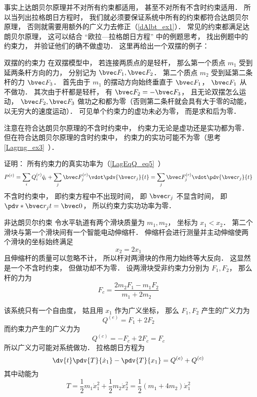 事实上达朗贝尔原理并不对所有约束都适用， 甚至不对所有不含时约束适用． 所以当列出拉格朗日方程时， 我们就必须要保证系统中所有的约束都符合达朗贝尔原理， 否则就需要用额外的广义力去修正（\autoref{dAlbt_ex1}）． 常见的约束都满足达朗贝尔原理， 这可以结合 “欧拉—拉格朗日方程” 中的例题思考， 找出例题中的约束力， 并验证他们的确不做虚功． 这里再给出一个双摆的例子：

\begin{example}{双摆的约束力}
在双摆模型中， 若连接两质点的是轻杆， 那么第一个质点 $m_1$ 受到延两条杆方向的力， 分别记为 $\bvec F_1, \bvec F_2$． 第二个质点 $m_2$ 受到延第二条杆的力 $\bvec F_3$． 首先由于 $m_1$ 的摆动方向始终垂直于 $\bvec F_1$， $\bvec F_1$ 从不做功． 其次由于杆都是轻杆， 有 $\bvec F_2 = -\bvec F_3$， 且无论双摆怎么运动， $\bvec F_2, \bvec F_3$ 做功之和都为零（否则第二条杆就会具有大于零的动能， 以无穷大的速度运动）． 可见单个约束力的虚功未必为零， 而是求和后为零．
\end{example}

注意在符合达朗贝尔原理的不含时约束中， 约束力无论是虚功还是实功都为零． 但在符合达朗贝尔原理的含时约束中， 约束力的实功可能不为零（思考\autoref{Lagrng_ex3}~）．

证明： 所有约束力的真实功率为（\autoref{LagEqQ_eq5}~）
\begin{equation}
P^{(c)} = \sum_i Q_i^{(c)} \dot q_i + \sum_j \bvec F_j^{(c)} \vdot \pdv{\bvec r_j}{t} = \sum_j \bvec F_j^{(c)} \vdot \pdv{\bvec r_j}{t}
\end{equation}
不含时约束中， 即约束方程中不出现时间， 即 $\bvec r_j$ 不显含时间， 即 $\pdv*{\bvec r_j}{t} = \bvec 0$， 所以约束力实功功率为零．

\begin{example}{非达朗贝尔约束}\label{dAlbt_ex1}
令水平轨道有两个滑块质量为 $m_1,m_2$， 坐标为 $x_1<x_2$． 第二个滑块与第一个滑块间有一个智能电动伸缩杆． 伸缩杆会进行测量并主动伸缩使两个滑块的坐标始终满足
\begin{equation}
x_2 = 2x_1
\end{equation}
且伸缩杆的质量可以忽略不计， 所以杆对两滑块的作用力始终等大反向． 这显然是一个不含时约束， 但做功却不为零． 设两滑块受非约束力分别为 $F_1,F_2$， 那么杆的力为
\begin{equation}
F_c = \frac{2m_2F_1 - m_1F_2}{m_1+2m_2}
\end{equation}

该系统只有一个自由度， 姑且用 $x_1$ 作为广义坐标， 那么 $F_1,F_2$ 产生的广义力为
\begin{equation}
Q^{(e)} = F_1 + 2F_2
\end{equation}
而约束力产生的广义力为
\begin{equation}
Q^{(c)} = -F_c + 2F_c = F_c
\end{equation}
所以广义力可能对系统做功． 拉格朗日方程为
\begin{equation}
\dv{t}\pdv{T}{\dot x_1} - \pdv{T}{x_1} = Q^{(e)} + Q^{(c)}
\end{equation}
其中动能为
\begin{equation}
T = \frac{1}{2}m_1\dot x_1^2 + \frac{1}{2}m_2 \dot x_2^2 = \frac{1}{2}(m_1 + 4m_2)\dot x_1^2
\end{equation}
\end{example}
